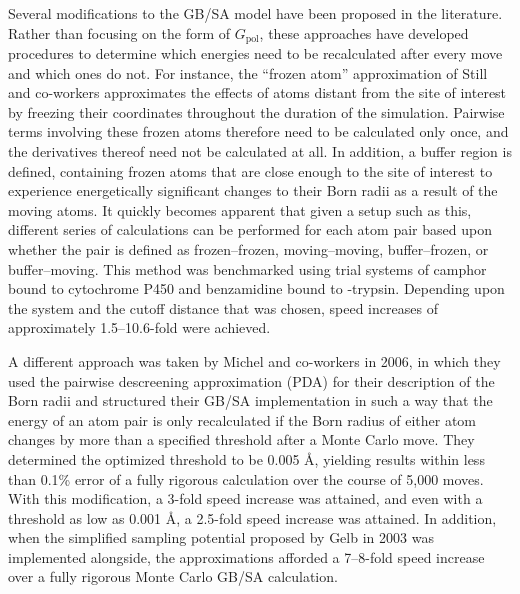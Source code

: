 \documentclass[12pt]{report}
\begin{document}
Several modifications to the GB/SA model have been proposed in the literature.\cite{guvench, michel4, gelb, felts1} Rather than focusing on the form of $G_{\textrm{pol}}$, these approaches have developed procedures to determine which energies need to be recalculated after every move and which ones do not. For instance, the ``frozen atom'' approximation of Still and co-workers\cite{guvench} approximates the effects of atoms distant from the site of interest by freezing their coordinates throughout the duration of the simulation. Pairwise terms involving these frozen atoms therefore need to be calculated only once, and the derivatives thereof need not be calculated at all. In addition, a buffer region is defined, containing frozen atoms that are close enough to the site of interest to experience energetically significant changes to their Born radii as a result of the moving atoms. It quickly becomes apparent that given a setup such as this, different series of calculations can be performed for each atom pair based upon whether the pair is defined as frozen--frozen, moving--moving, buffer--frozen, or buffer--moving. This method was benchmarked using trial systems of camphor bound to cytochrome P450 and benzamidine bound to \textbeta-trypsin. Depending upon the system and the cutoff distance that was chosen, speed increases of approximately 1.5--10.6-fold were achieved.

A different approach was taken by Michel and co-workers\cite{michel4} in 2006, in which they used the pairwise descreening approximation (PDA)\cite{hawkins} for their description of the Born radii and structured their GB/SA implementation in such a way that the energy of an atom pair is only recalculated if the Born radius of either atom changes by more than a specified threshold after a Monte Carlo move. They determined the optimized threshold to be 0.005 \AA, yielding results within less than 0.1\% error of a fully rigorous calculation over the course of 5,000 moves. With this modification, a 3-fold speed increase was attained, and even with a threshold as low as 0.001 \AA, a 2.5-fold speed increase was attained. In addition, when the simplified sampling potential proposed by Gelb\cite{gelb} in 2003 was implemented alongside, the approximations afforded a 7--8-fold speed increase over a fully rigorous Monte Carlo GB/SA calculation.

\end{document}
